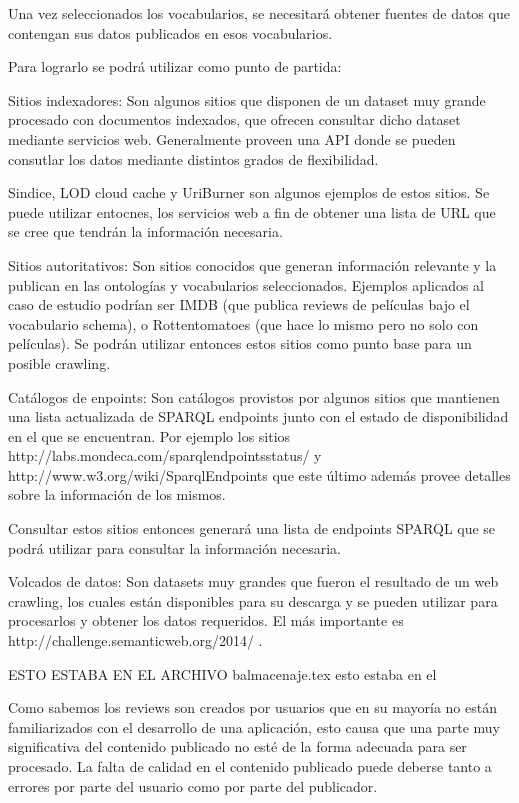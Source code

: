 Una vez seleccionados los vocabularios, se necesitará obtener fuentes de datos que contengan sus datos publicados en esos vocabularios.
 
Para lograrlo se podrá utilizar como punto de partida:

Sitios indexadores: Son algunos sitios que disponen de un dataset muy grande procesado con documentos indexados, que ofrecen consultar dicho 
dataset mediante servicios web. Generalmente proveen una API donde se pueden consutlar los datos mediante distintos grados de flexibilidad.

Sindice, LOD cloud cache y UriBurner son algunos ejemplos de estos sitios. Se puede utilizar entocnes, los servicios web a fin
de obtener una lista de URL que se cree que tendrán la información necesaria.

Sitios autoritativos: Son sitios conocidos que generan información relevante y la publican en las ontologías y vocabularios 
seleccionados. Ejemplos aplicados al caso de estudio podrían ser IMDB (que publica reviews de películas bajo el vocabulario schema), o Rottentomatoes
(que hace lo mismo pero no solo con películas). Se podrán utilizar entonces estos sitios como punto base para un posible crawling.

Catálogos de enpoints: Son catálogos provistos por algunos sitios que mantienen una lista actualizada de SPARQL endpoints 
junto con el estado de disponibilidad en el que se encuentran. Por ejemplo los sitios http://labs.mondeca.com/sparqlendpointsstatus/ y 
http://www.w3.org/wiki/SparqlEndpoints que este último además provee detalles sobre la información de los mismos.

Consultar estos sitios entonces generará una lista de endpoints SPARQL que se podrá utilizar para consultar la información necesaria.

Volcados de datos: Son datasets muy grandes que fueron el resultado de un web crawling, los cuales están disponibles para su descarga 
y se pueden utilizar para procesarlos y obtener los datos requeridos. El más importante es http://challenge.semanticweb.org/2014/ .

%
ESTO ESTABA EN EL ARCHIVO balmacenaje.tex
esto estaba en el 

% 
Como sabemos los reviews son creados por usuarios que en su mayoría no están familiarizados con el desarrollo de una 
aplicación, esto causa que una parte muy significativa del contenido publicado no esté de la forma adecuada para ser procesado. 
La falta de calidad en el contenido publicado puede deberse tanto a errores por parte del usuario como por parte del publicador.


